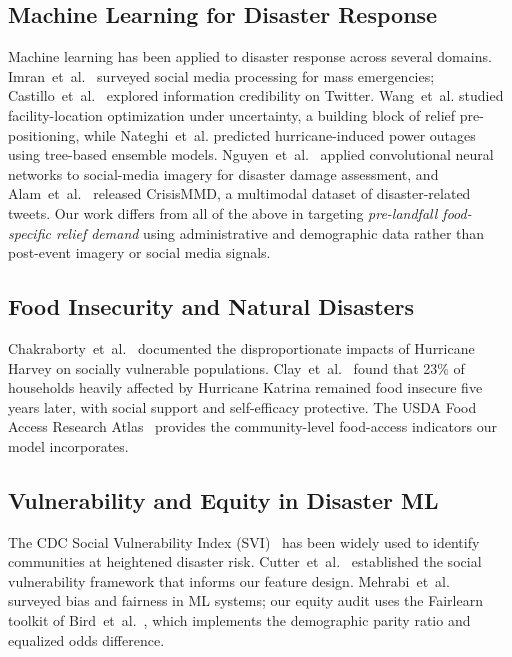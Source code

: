 \documentclass[conference]{IEEEtran}
\renewcommand{\_}{\origunderscore\allowbreak}
\begin{document}
\subsection{Machine Learning for Disaster Response}
Machine learning has been applied to disaster response across
several domains. Imran~et~al.~\cite{imran_social_media} surveyed
social media processing for mass emergencies;
Castillo~et~al.~\cite{castillo_credibility} explored information
credibility on Twitter. Wang~et~al.
\cite{wang_disaster_logistics} studied facility-location
optimization under uncertainty, a building block of relief
pre-positioning, while Nateghi~et~al.
\cite{nateghi_power_outage} predicted hurricane-induced power
outages using tree-based ensemble models.
Nguyen~et~al.~\cite{nguyen_damage_imagery} applied convolutional
neural networks to social-media imagery for disaster damage
assessment, and Alam~et~al.~\cite{alam_crisismmd} released
CrisisMMD, a multimodal dataset of disaster-related tweets. Our work differs from all of the above in
targeting \textit{pre-landfall food-specific relief demand} using
administrative and demographic data rather than post-event
imagery or social media signals.

\subsection{Food Insecurity and Natural Disasters}
Chakraborty~et~al.~\cite{chakraborty_harvey} documented the
disproportionate impacts of Hurricane Harvey on socially
vulnerable populations. Clay~et~al.~\cite{clay_katrina_food} found that 23\% of
households heavily affected by Hurricane Katrina remained food
insecure five years later, with social support and self-efficacy
protective.
The USDA Food Access Research Atlas~\cite{usda_food_atlas}
provides the community-level food-access indicators our model
incorporates.

\subsection{Vulnerability and Equity in Disaster ML}
The CDC Social Vulnerability Index (SVI)~\cite{flanagan_svi} has
been widely used to identify communities at heightened disaster
risk. Cutter~et~al.~\cite{cutter_svi} established the social
vulnerability framework that informs our feature design.
Mehrabi~et~al.~\cite{mehrabi_fairness} surveyed bias and
fairness in ML systems; our equity audit uses the Fairlearn
toolkit of Bird~et~al.~\cite{bird_fairlearn}, which implements
the demographic parity ratio and equalized odds difference.
\end{document}
